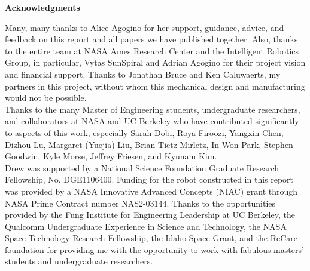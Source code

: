 \documentclass[12pt]{report}
\begin{document}
\begin{center}
\begin{minipage}{0.75\linewidth}
\vspace{4cm}
{\centering \textbf{Acknowledgments} \\[2cm] \par}
Many, many thanks to Alice Agogino for her support, guidance, advice, and feedback on this report and all papers we have published together.
Also, thanks to the entire team at NASA Ames Research Center and the Intelligent Robotics Group, in particular, Vytas SunSpiral and Adrian Agogino for their project vision and financial support.
Thanks to Jonathan Bruce and Ken Caluwaerts, my partners in this project, without whom this mechanical design and manufacturing would not be possible.\\

Thanks to the many Master of Engineering students, undergraduate researchers, and collaborators at NASA and UC Berkeley who have contributed significantly to aspects of this work, especially Sarah Dobi, Roya Firoozi, Yangxin Chen, Dizhou Lu, Margaret (Yuejia) Liu, Brian Tietz Mirletz, In Won Park, Stephen Goodwin, Kyle Morse, Jeffrey Friesen, and Kyunam Kim. \\

Drew was supported by a National Science Foundation Graduate Research Fellowship, No. DGE1106400. Funding for the robot constructed in this report was provided by a NASA Innovative Advanced Concepts (NIAC) grant through NASA Prime Contract number NAS2-03144.
Thanks to the opportunities provided by the Fung Institute for Engineering Leadership at UC Berkeley, the Qualcomm Undergraduate Experience in Science and Technology, the NASA Space Technology Research Fellowship, the Idaho Space Grant, and the ReCare foundation for providing me with the opportunity to work with fabulous masters' students and undergraduate researchers.
\end{minipage}
\end{center}
\clearpage

\tableofcontents
\listoffigures
\listoftables
\clearpage



\end{document}
